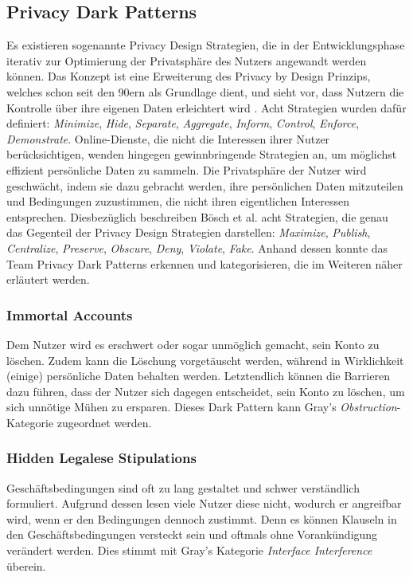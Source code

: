 \documentclass[a4paper]{article}
\begin{document}
\subsection{Privacy Dark Patterns}
\label{sub:privacy_dark_patterns}
Es existieren sogenannte Privacy Design Strategien, die in der Entwicklungsphase iterativ zur Optimierung der Privatsphäre des Nutzers angewandt werden können. Das Konzept ist eine Erweiterung des Privacy by Design Prinzips, welches schon seit den 90ern als Grundlage dient, und sieht vor, dass Nutzern die Kontrolle über ihre eigenen Daten erleichtert wird \cite{boesch}. Acht Strategien wurden dafür definiert: \textit{Minimize}, \textit{Hide}, \textit{Separate}, \textit{Aggregate}, \textit{Inform}, \textit{Control}, \textit{Enforce}, \textit{Demonstrate}.\newline
Online-Dienste, die nicht die Interessen ihrer Nutzer berücksichtigen, wenden hingegen gewinnbringende Strategien an, um möglichst effizient persönliche Daten zu sammeln. Die Privatsphäre der Nutzer wird geschwächt, indem sie dazu gebracht werden, ihre persönlichen Daten mitzuteilen und Bedingungen zuzustimmen, die nicht ihren eigentlichen Interessen entsprechen. Diesbezüglich beschreiben Bösch et al. acht Strategien, die genau das Gegenteil der Privacy Design Strategien darstellen: 
\textit{Maximize}, \textit{Publish}, \textit{Centralize}, \textit{Preserve}, \textit{Obscure}, \textit{Deny}, \textit{Violate}, \textit{Fake}. Anhand dessen konnte das Team Privacy Dark Patterns erkennen und kategorisieren, die im Weiteren näher erläutert werden.

\subsubsection{Immortal Accounts}
\label{sssec:immortal_accounts}
Dem Nutzer wird es erschwert oder sogar unmöglich gemacht, sein Konto zu löschen. Zudem kann die Löschung vorgetäuscht werden, während in Wirklichkeit (einige) persönliche Daten behalten werden. Letztendlich können die Barrieren dazu führen, dass der Nutzer sich dagegen entscheidet, sein Konto zu löschen, um sich unnötige Mühen zu ersparen.\newline
Dieses Dark Pattern kann Gray's \textit{Obstruction}-Kategorie zugeordnet werden.

\subsubsection{Hidden Legalese Stipulations}
\label{sssec:hidden_legalese_stipulations}
Geschäftsbedingungen sind oft zu lang gestaltet und schwer verständlich formuliert. Aufgrund dessen lesen viele Nutzer diese nicht, wodurch er angreifbar wird, wenn er den Bedingungen dennoch zustimmt. Denn es können Klauseln in den Geschäftsbedingungen versteckt sein und oftmals ohne Vorankündigung verändert werden.\newline
Dies stimmt mit Gray's Kategorie \textit{Interface Interference} überein.
\end{document}
